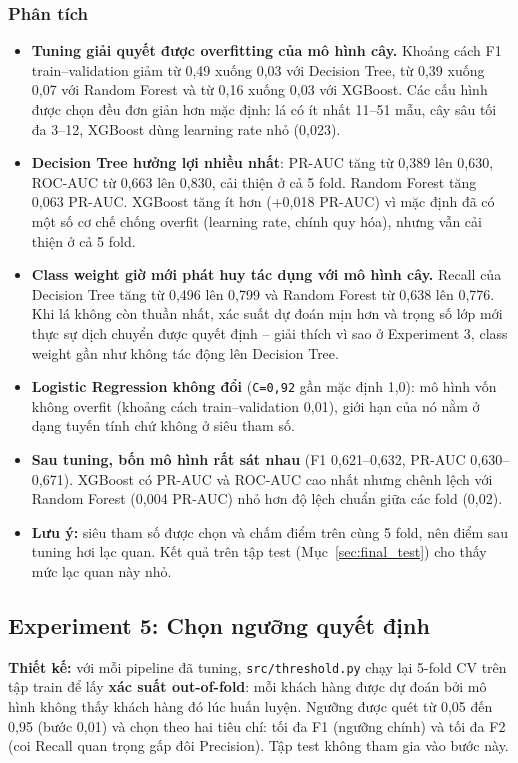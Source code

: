 \subsubsection{Phân tích}
\begin{itemize}
    \item \textbf{Tuning giải quyết được overfitting của mô hình cây.} Khoảng cách F1 train--validation giảm từ 0,49 xuống 0,03 với Decision Tree, từ 0,39 xuống 0,07 với Random Forest và từ 0,16 xuống 0,03 với XGBoost. Các cấu hình được chọn đều đơn giản hơn mặc định: lá có ít nhất 11--51 mẫu, cây sâu tối đa 3--12, XGBoost dùng learning rate nhỏ (0,023).
    \item \textbf{Decision Tree hưởng lợi nhiều nhất}: PR-AUC tăng từ 0,389 lên 0,630, ROC-AUC từ 0,663 lên 0,830, cải thiện ở cả 5 fold. Random Forest tăng 0,063 PR-AUC. XGBoost tăng ít hơn (+0,018 PR-AUC) vì mặc định đã có một số cơ chế chống overfit (learning rate, chính quy hóa), nhưng vẫn cải thiện ở cả 5 fold.
    \item \textbf{Class weight giờ mới phát huy tác dụng với mô hình cây.} Recall của Decision Tree tăng từ 0,496 lên 0,799 và Random Forest từ 0,638 lên 0,776. Khi lá không còn thuần nhất, xác suất dự đoán mịn hơn và trọng số lớp mới thực sự dịch chuyển được quyết định -- giải thích vì sao ở Experiment 3, class weight gần như không tác động lên Decision Tree.
    \item \textbf{Logistic Regression không đổi} (\texttt{C=0,92} gần mặc định 1,0): mô hình vốn không overfit (khoảng cách train--validation 0,01), giới hạn của nó nằm ở dạng tuyến tính chứ không ở siêu tham số.
    \item \textbf{Sau tuning, bốn mô hình rất sát nhau} (F1 0,621--0,632, PR-AUC 0,630--0,671). XGBoost có PR-AUC và ROC-AUC cao nhất nhưng chênh lệch với Random Forest (0,004 PR-AUC) nhỏ hơn độ lệch chuẩn giữa các fold (0,02).
    \item \textbf{Lưu ý:} siêu tham số được chọn và chấm điểm trên cùng 5 fold, nên điểm sau tuning hơi lạc quan. Kết quả trên tập test (Mục~\ref{sec:final_test}) cho thấy mức lạc quan này nhỏ.
\end{itemize}

\subsection{Experiment 5: Chọn ngưỡng quyết định}\label{sec:exp5}
\textbf{Thiết kế:} với mỗi pipeline đã tuning, \texttt{src/threshold.py} chạy lại 5-fold CV trên tập train để lấy \textbf{xác suất out-of-fold}: mỗi khách hàng được dự đoán bởi mô hình không thấy khách hàng đó lúc huấn luyện. Ngưỡng được quét từ 0,05 đến 0,95 (bước 0,01) và chọn theo hai tiêu chí: tối đa F1 (ngưỡng chính) và tối đa F2 (coi Recall quan trọng gấp đôi Precision). Tập test không tham gia vào bước này.

